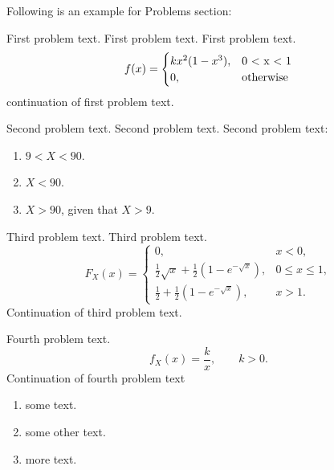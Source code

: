 Following is an example for Problems section:

\begin{problems}[Problems]

\item First problem text. First problem text. First problem text. 
\[
f(x) = \begin{cases}
kx^{2} (1-x^{3} ), & $0 < x < 1$ \\
0, & \mbox{otherwise}
\end{cases}
\]
continuation of first problem text.


\item Second problem text. Second problem text. Second problem text:
\begin{enumerate}[1.]
\item $9 < X < 90$.
\item $X < 90$.
\item $X > 90$, given that $X > 9$.
\end{enumerate}

\item Third problem text. Third problem text.
\[
F_{X} (x)  =  \begin{cases}
0, &  x < 0, \\
\frac{1}{2} \sqrt {x} + \frac{1}{2}(1 - e^{- \sqrt {x} }), 
& 0 \leq x \leq 1, \\
\frac{1}{2} + \frac{1}{2} (1 - e^{- \sqrt {x} }), & x > 1.
\end{cases}
\]
Continuation of third problem text.

\item Fourth problem text.
\[
f_{X} (x) = \frac{k}{x}, \qquad k > 0. 
\]
Continuation of fourth problem text
\begin{enumerate}[1.]
\item some text.
\item some other text.
\item more text.
\end{enumerate}
\end{problems}
